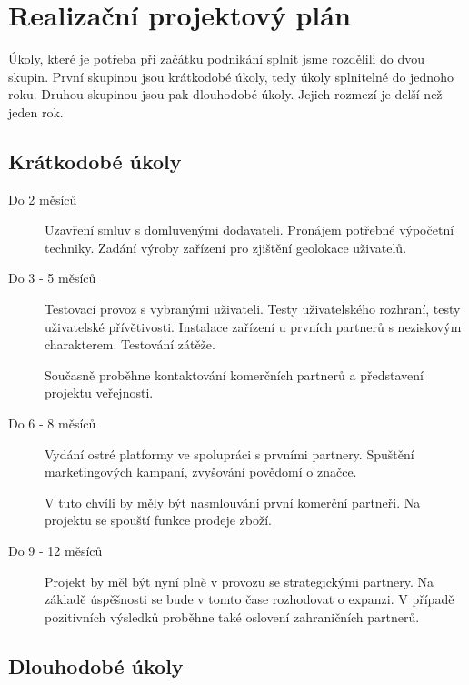 \documentclass[12pt,czech]{article}
\begin{document}
\newpage
\section{Realizační projektový plán}

Úkoly, které je potřeba při začátku podnikání splnit jsme rozdělili do dvou skupin.
První skupinou jsou krátkodobé úkoly, tedy úkoly splnitelné do jednoho roku.
Druhou skupinou jsou pak dlouhodobé úkoly.
Jejich rozmezí je delší než jeden rok.

\subsection{Krátkodobé úkoly}

\begin{description}
    \item[Do 2 měsíců] Uzavření smluv s domluvenými dodavateli.
    Pronájem potřebné výpočetní techniky.
    Zadání výroby zařízení pro zjištění geolokace uživatelů.

    \item[Do 3 - 5 měsíců] Testovací provoz s vybranými uživateli.
    Testy uživatelského rozhraní, testy uživatelské přívětivosti.
    Instalace zařízení u prvních partnerů s neziskovým charakterem.
    Testování zátěže.

    Současně proběhne kontaktování komerčních partnerů a představení projektu veřejnosti.

    \item[Do 6 - 8 měsíců] Vydání ostré platformy ve spolupráci s prvními partnery.
    Spuštění marketingových kampaní, zvyšování povědomí o značce.

    V tuto chvíli by měly být nasmlouváni první komerční partneři.
    Na projektu se spouští funkce prodeje zboží.

    \item[Do 9 - 12 měsíců] Projekt by měl být nyní plně v provozu se strategickými partnery.
    Na základě úspěšnosti se bude v tomto čase rozhodovat o expanzi.
    V případě pozitivních výsledků proběhne také oslovení zahraničních partnerů.

\end{description}

\subsection{Dlouhodobé úkoly}
\end{document}
